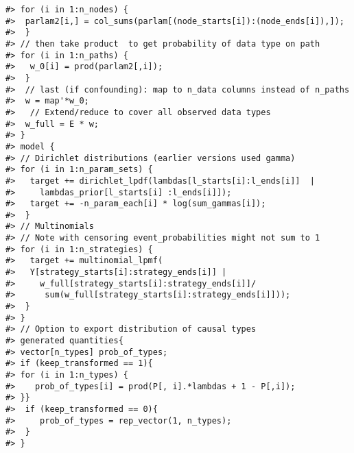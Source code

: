 \documentclass[
  11pt,
  article]{jss}
\begin{document}
\begin{verbatim}
#> for (i in 1:n_nodes) {
#>  parlam2[i,] = col_sums(parlam[(node_starts[i]):(node_ends[i]),]);
#>  }
#> // then take product  to get probability of data type on path
#> for (i in 1:n_paths) {
#>   w_0[i] = prod(parlam2[,i]);
#>  }
#>  // last (if confounding): map to n_data columns instead of n_paths
#>  w = map'*w_0;
#>   // Extend/reduce to cover all observed data types
#>  w_full = E * w;
#> }
#> model {
#> // Dirichlet distributions (earlier versions used gamma)
#> for (i in 1:n_param_sets) {
#>   target += dirichlet_lpdf(lambdas[l_starts[i]:l_ends[i]]  |
#>     lambdas_prior[l_starts[i] :l_ends[i]]);
#>   target += -n_param_each[i] * log(sum_gammas[i]);
#>  }
#> // Multinomials
#> // Note with censoring event_probabilities might not sum to 1
#> for (i in 1:n_strategies) {
#>   target += multinomial_lpmf(
#>   Y[strategy_starts[i]:strategy_ends[i]] |
#>     w_full[strategy_starts[i]:strategy_ends[i]]/
#>      sum(w_full[strategy_starts[i]:strategy_ends[i]]));
#>  }
#> }
#> // Option to export distribution of causal types
#> generated quantities{
#> vector[n_types] prob_of_types;
#> if (keep_transformed == 1){
#> for (i in 1:n_types) {
#>    prob_of_types[i] = prod(P[, i].*lambdas + 1 - P[,i]);
#> }}
#>  if (keep_transformed == 0){
#>     prob_of_types = rep_vector(1, n_types);
#>  }
#> }
\end{verbatim}
\end{document}
